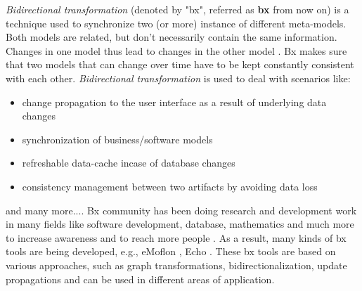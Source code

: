 \textit{Bidirectional transformation} (denoted by "bx", referred as \textbf{bx} from now on) is a technique used to synchronize two (or more) instance of different meta-models. Both models are related, but don't necessarily contain the same information. Changes in one model thus lead to changes in the other model \cite{bx-grace}. Bx makes sure that two models that can change over time have to be kept constantly consistent with each other.
\newline\newline\textit{Bidirectional transformation} is used to deal with scenarios like:
\begin{itemize}
	\item {change propagation to the user interface as a result of underlying data changes}	
	\item {synchronization of business/software models}
	\item {refreshable data-cache incase of database changes}
	\item {consistency management between two artifacts by avoiding data loss}
\end{itemize}
    and many more....
\newline\newline Bx community has been doing research and development work in many fields like software development, database, mathematics and much more to increase awareness and to reach more people \cite{bx-dagstuhl}\cite{bx-grace}. As a result, many kinds of bx tools are being developed, e.g., eMoflon \cite{emoflon-part4}, Echo \cite{echo}. These bx tools are based on various approaches, such as graph transformations, bidirectionalization, update propagations \cite{bx-community} and can be used in different areas of application.

